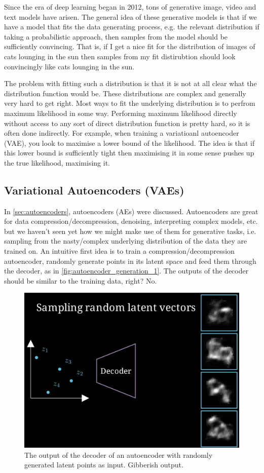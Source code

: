 \documentclass[11pt]{article}
\begin{document}
Since the era of deep learning began in 2012, tons of generative image, video and text models have arisen. The general idea of these generative models is that if we have a model that fits the data generating process, e.g. the relevant distribution if taking a probabilistic approach, then samples from the model should be sufficiently convincing. That is, if I get a nice fit for the distribution of images of cats lounging in the sun then samples from my fit distirubtion should look convincingly like cats lounging in the sun.

The problem with fitting such a distribution is that it is not at all clear what the distribution function would be. These distributions are complex and generally very hard to get right. Most ways to fit the underlying distribution is to perfrom maximum likelihood in some way. Performing maximum likelihood directly without access to any sort of direct distribution function is pretty hard, so it is often done indirectly. For example, when training a variatioanl autoencoder (VAE), you look to maximise a lower bound of the likelihood. The idea is that if this lower bound is sufficiently tight then maximising it in some sense pushes up the true likelihood, maximising it.

\subsection{Variational Autoencoders (VAEs)}
In \autoref{sec:autoencoders}, autoencoders (AEs) were discussed. Autoencoders are great for data compression/decompression, denoising, interpreting complex models, etc. but we haven't seen yet how we might make use of them for generative tasks, i.e. sampling from the nasty/complex underlying distribution of the data they are trained on. An intuitive first idea is to train a compression/decompression autoencoder, randomly generate points in its latent space and feed them through the decoder, as in \autoref{fig:autoencoder_generation_1}. The outputs of the decoder should be similar to the training data, right? No.

\begin{figure}[ht]
    \centering
    \includegraphics[width=0.60\columnwidth]{./figures/generative_models/AE_gen_1.png}
    \caption{The output of the decoder of an autoencoder with randomly generated latent points as input. Gibberish output.}
    \label{fig:autoencoder_generation_1}
\end{figure}
\end{document}
